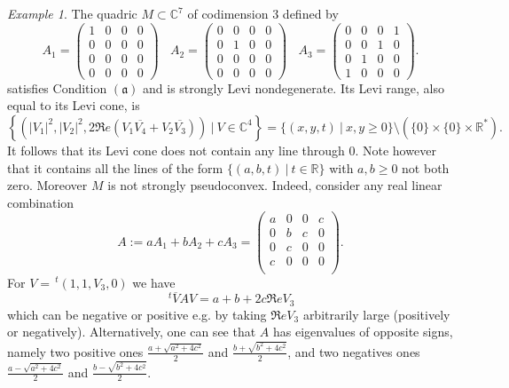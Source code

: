 \documentclass[12pt]{amsart}
\newcommand{\C}{\mathbb C}
\newcommand{\R}{\mathbb R}
\newcommand{\transp}{\,^t}
\newcommand{\aaa}{\mathfrak{(a)}}
\theoremstyle{remark}
\theoremstyle{example}
\newtheorem{example}[theo]{Example}
\theoremstyle{definition}
\numberwithin{equation}{section}
\begin{document}
\begin{example}\label{exline}
The quadric $M\subset \C^7$ of codimension $3$ defined by   
$$A_1=
\begin{pmatrix}
	1& 0 & 0 & 0 \\ 0 &0 & 0 & 0 \\ 0 &0 & 0 & 0 \\ 0 &0 & 0 & 0
\end{pmatrix} \ \ \ \ 
A_2=
\begin{pmatrix}
	0& 0 & 0 & 0 \\ 0 &1 & 0 & 0 \\ 0 &0 & 0 & 0 \\ 0 &0 & 0 & 0
\end{pmatrix}\ \ \ \ 
A_3=
\begin{pmatrix}
	0& 0 & 0 & 1 \\ 0 &0 & 1 & 0 \\ 0 &1 & 0 & 0 \\ 1 &0 & 0 & 0
\end{pmatrix}.$$
 satisfies Condition $\aaa$ and is strongly Levi nondegenerate. Its Levi range, also equal to its Levi cone, is 
  $$\left\{\left(|V_1|^2,|V_2|^2,2\Re e (V_1\overline{V_4}+V_2\overline{V_3})\right) \ | \ V\in \C^4 \right\} = \{ (x,y,t) \ | \ x, y\geq 0\} \setminus \left(\{0\}\times \{0\} \times \R^*\right).$$ 
It follows that its Levi cone
 does not contain any line through 0. Note however that it contains all the lines of the form $\{(a,b,t) \ | \ t \in \R\}$ with $a,b \geq 0$ not both zero.  Moreover  $M$ is not strongly pseudoconvex. Indeed, consider any real linear combination 
 $$A:=aA_1+bA_2+cA_3=\begin{pmatrix}
	a& 0 & 0 & c \\ 0 &b & c & 0 \\ 0 &c & 0 & 0 \\ c &0 & 0 & 0\\
\end{pmatrix}.$$
For $V=\transp (1,1,V_3,0)$ we have 
 $$\transp \overline{V} A V= a+b+2c\Re e V_3$$
 which can be  negative or positive e.g. by taking $\Re e V_3$ arbitrarily large (positively or negatively). Alternatively, one can see that $A$ has   
 eigenvalues of opposite signs, namely two positive ones $\frac{a+\sqrt{a^2+4c^2}}{2}$ and $\frac{b+\sqrt{b^2+4c^2}}{2}$,  and two negatives ones 
 $\frac{a-\sqrt{a^2+4c^2}}{2}$ and $\frac{b-\sqrt{b^2+4c^2}}{2}$.      
 
\end{example} 
\end{document}
